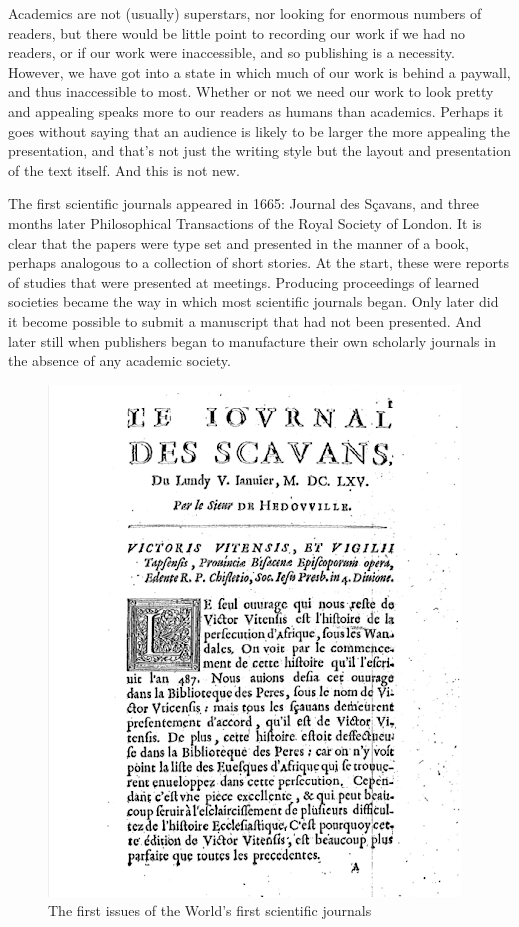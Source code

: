 \documentclass[
]{krantz}
\begin{document}
Academics are not (usually) superstars, nor looking for enormous numbers of readers, but there would be little point to recording our work if we had no readers, or if our work were inaccessible, and so publishing is a necessity. However, we have got into a state in which much of our work is behind a paywall, and thus inaccessible to most. Whether or not we need our work to look pretty and appealing speaks more to our readers as humans than academics. Perhaps it goes without saying that an audience is likely to be larger the more appealing the presentation, and that's not just the writing style but the layout and presentation of the text itself. And this is not new.

The first scientific journals appeared in 1665: Journal des Sçavans, and three months later Philosophical Transactions of the Royal Society of London. It is clear that the papers were type set and presented in the manner of a book, perhaps analogous to a collection of short stories. At the start, these were reports of studies that were presented at meetings. Producing proceedings of learned societies became the way in which most scientific journals began. Only later did it become possible to submit a manuscript that had not been presented. And later still when publishers began to manufacture their own scholarly journals in the absence of any academic society.



\begin{figure}
\includegraphics[width=0.5\linewidth]{figures/scavans} \caption{The first issues of the World's first scientific journals}\label{fig:scavans}
\end{figure}
\end{document}
